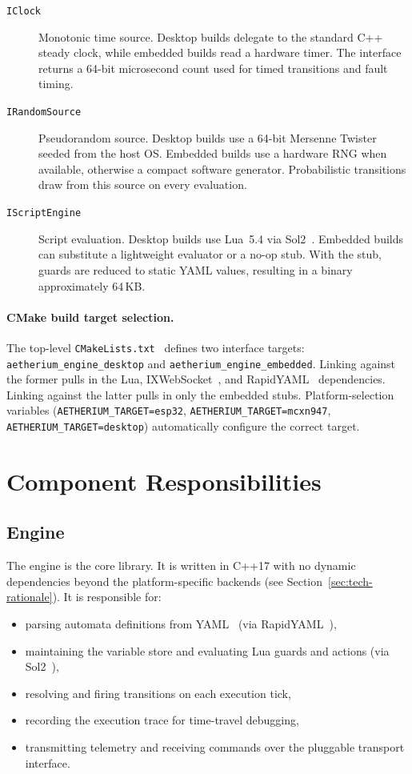 \begin{description}
  \item[\texttt{IClock}] Monotonic time source. Desktop builds delegate to the standard C++ steady clock, while embedded builds read a hardware timer. The interface returns a 64-bit microsecond count used for timed transitions and fault timing.
  \item[\texttt{IRandomSource}] Pseudorandom source. Desktop builds use a 64-bit Mersenne Twister seeded from the host OS. Embedded builds use a hardware RNG when available, otherwise a compact software generator. Probabilistic transitions draw from this source on every evaluation.
  \item[\texttt{IScriptEngine}] Script evaluation. Desktop builds use Lua~5.4 via Sol2~\cite{Sol2}. Embedded builds can substitute a lightweight evaluator or a no-op stub. With the stub, guards are reduced to static YAML values, resulting in a binary approximately 64\,KB.
\end{description}

\paragraph{CMake build target selection.}
The top-level \texttt{CMakeLists.txt}~\cite{CMake} defines two interface targets: \texttt{aetherium\_engine\_desktop} and \texttt{aetherium\_engine\_embedded}. Linking against the former pulls in the Lua, IXWebSocket~\cite{IXWebSocket}, and RapidYAML~\cite{RapidYAML} dependencies. Linking against the latter pulls in only the embedded stubs. Platform-selection variables (\texttt{AETHERIUM\_TARGET=esp32}, \texttt{AETHERIUM\_TARGET=mcxn947}, \texttt{AETHERIUM\_TARGET=desktop}) automatically configure the correct target.

\section{Component Responsibilities}
\label{sec:components}

\subsection{Engine}

The engine is the core library. It is written in C++17 with no dynamic dependencies beyond the platform-specific backends (see Section~\ref{sec:tech-rationale}). It is responsible for:
\begin{itemize}
  \item parsing automata definitions from YAML~\cite{YAML122} (via RapidYAML~\cite{RapidYAML}),
  \item maintaining the variable store and evaluating Lua guards and actions (via Sol2~\cite{Sol2}),
  \item resolving and firing transitions on each execution tick,
  \item recording the execution trace for time-travel debugging,
  \item transmitting telemetry and receiving commands over the pluggable transport interface.
\end{itemize}

